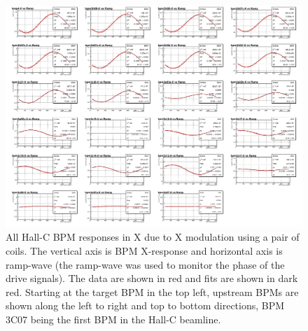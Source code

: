 \begin{singlespace}
\begin{figure}[!h]
	\begin{center}
	\includegraphics[width=15.0cm]{figures/BModBpmsX}
	\end{center}
	\caption
	{All Hall-C BPM responses in X due to X modulation using a pair of coils. The vertical axis is BPM X-response and horizontal axis is ramp-wave (the ramp-wave was used to monitor the phase of the drive signals). The data are shown in red and fits are shown in dark red. Starting at the target BPM in the top left, upstream BPMs are shown along the left to right and top to bottom directions, BPM 3C07 being the first BPM in the Hall-C beamline. 
	}
	\label{fig:BModBpmsX}
\end{figure}
\end{singlespace}


